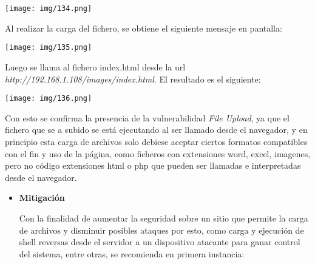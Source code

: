 \documentclass[12pt,oneside,a4paper]{book}
\begin{document}
\begin{enumerate}
\vspace{1em}

\begin{center}
    \texttt{[image: img/134.png]}
\end{center}

\vspace{1em}

\hspace{20pt}
Al realizar la carga del fichero, se obtiene el siguiente mensaje en pantalla:

\vspace{1em}

\begin{center}
    \texttt{[image: img/135.png]}
\end{center}

\vspace{1em}

\hspace{20pt}
Luego se llama al fichero index.html desde la url \textit{http://192.168.1.108/images/index.html}. El resultado es el siguiente:

\vspace{1em}

\begin{center}
    \texttt{[image: img/136.png]}
\end{center}

\vspace{1em}

\hspace{20pt}
Con esto se confirma la presencia de la vulnerabilidad \textit{File Upload}, ya que el fichero que se a subido se está ejecutando al ser llamado desde el navegador, y en principio esta carga de archivos solo debiese aceptar ciertos formatos compatibles con el fin y uso de la página, como ficheros con extensiones word, excel, imagenes, pero no código extensiones html o php que pueden ser llamadas e interpretadas desde el navegador.

\vspace{2em}

\begin{itemize}
	\item 	\textbf{Mitigación}

\vspace{1em}

\hspace{20pt}
Con la finalidad de aumentar la seguridad sobre un sitio que permite la carga de archivos y disminuir posibles ataques por esto, como carga y ejecución de shell reversas desde el servidor a un dispositivo atacante para ganar control del sistema, entre otras, se recomienda en primera instancia:


\end{itemize}
\end{enumerate}
\end{document}
